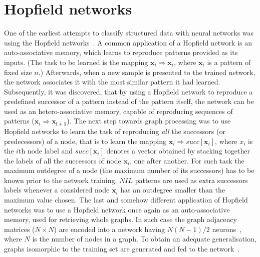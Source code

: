 \section{Hopfield networks}
One of the earliest attempts to classify structured data with neural networks was using the Hopfield networks~\cite{goulon2005hopfield}. A common application of a Hopfield network is an auto-associative memory, which learns to reproduce patterns provided as its inputs. (The task to be learned is the mapping $\bm{x}_i \Rightarrow \bm{x}_i$, where $\bm{x}_i$ is a pattern of fixed size $n$.) Afterwards, when a new sample is presented to the trained network, the network associates it with the most similar pattern it had learned. Subsequently, it was discovered, that by using a Hopfield network to reproduce a predefined successor of a pattern instead of the pattern itself, the network can be used as an hetero-associative memory, capable of reproducing sequences of patterns ($\bm{x}_i \Rightarrow \bm{x_{i+1}}$). The next step towards graph processing was to use Hopfield networks to learn the task of reproducing \emph{all} the successors (or predecessors) of a node, that is to learn the mapping $\bm{x}_i \Rightarrow succ[\bm{x}_i]$, where $x_i$ is the $i$th node label and $succ[\bm{x}_i]$ denotes a vector obtained by stacking together the labels of all the successors of node $\bm{x}_i$, one after another. For such task the maximum outdegree of a node (the maximum number of its successors) has to be known prior to the network training. $NIL$ patterns are used as extra successors labels whenever a considered node $\bm{x}_i$ has an outdegree smaller than the maximum value chosen. The last and somehow different application of Hopfield networks was to use a Hopfield network once again as an auto-associative memory, used for retrieving whole graphs. In such case the graph adjacency matrices ($N \times N$) are encoded into a network having $N(N - 1)/2$ neurons~\cite{goulon2005hopfield}, where $N$ is the number of nodes in a graph. To obtain an adequate generalisation, graphs isomorphic to the training set are generated and fed to the network~\cite{kree1988recognition}.

